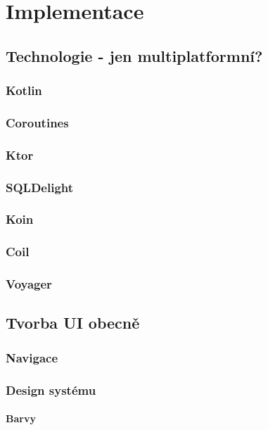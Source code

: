 \chapter{Implementace}

\section{Technologie - jen multiplatformní? }
\subsection{Kotlin}
\subsection{Coroutines}
\subsection{Ktor}
\subsection{SQLDelight}
\subsection{Koin}
\subsection{Coil}
\subsection{Voyager}

\section{Tvorba UI obecně}
\subsection{Navigace}
\subsection{Design systému}
\subsubsection{Barvy}
